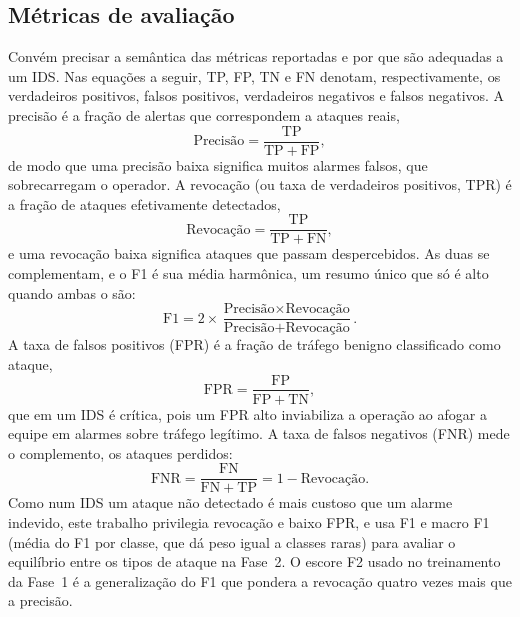 \documentclass[12pt,a4paper]{article}
\begin{document}
\subsection{Métricas de avaliação}
\label{subsec:metricas}

Convém precisar a semântica das métricas reportadas e por que são adequadas a
um IDS. Nas equações a seguir, TP, FP, TN e FN denotam, respectivamente, os
verdadeiros positivos, falsos positivos, verdadeiros negativos e falsos
negativos. A precisão é a fração de alertas que correspondem a ataques reais,
\begin{equation}
\text{Precisão} = \frac{\mathrm{TP}}{\mathrm{TP} + \mathrm{FP}},
\label{eq:precisao}
\end{equation}
de modo que uma precisão baixa significa muitos alarmes falsos, que
sobrecarregam o operador. A revocação (ou taxa de verdadeiros positivos, TPR) é
a fração de ataques efetivamente detectados,
\begin{equation}
\text{Revocação} = \frac{\mathrm{TP}}{\mathrm{TP} + \mathrm{FN}},
\label{eq:revocacao}
\end{equation}
e uma revocação baixa significa ataques que passam despercebidos. As duas se
complementam, e o F1 é sua média harmônica, um resumo único que só é alto quando
ambas o são:
\begin{equation}
\mathrm{F1} = 2 \times \frac{\text{Precisão} \times \text{Revocação}}{\text{Precisão} + \text{Revocação}}.
\label{eq:f1}
\end{equation}
A taxa de falsos positivos (FPR) é a fração de tráfego benigno classificado
como ataque,
\begin{equation}
\mathrm{FPR} = \frac{\mathrm{FP}}{\mathrm{FP} + \mathrm{TN}},
\label{eq:fpr}
\end{equation}
que em um IDS é crítica, pois um FPR alto inviabiliza a operação ao afogar a
equipe em alarmes sobre tráfego legítimo. A taxa de falsos negativos (FNR) mede
o complemento, os ataques perdidos:
\begin{equation}
\mathrm{FNR} = \frac{\mathrm{FN}}{\mathrm{FN} + \mathrm{TP}} = 1 - \text{Revocação}.
\label{eq:fnr}
\end{equation}
Como num IDS um ataque não detectado é mais custoso que um alarme indevido, este
trabalho privilegia revocação e baixo FPR, e usa F1 e macro F1 (média do F1 por
classe, que dá peso igual a classes raras) para avaliar o equilíbrio entre os
tipos de ataque na Fase~2. O escore F2 usado no treinamento da Fase~1 é a
generalização do F1 que pondera a revocação quatro vezes mais que a precisão.
\end{document}
